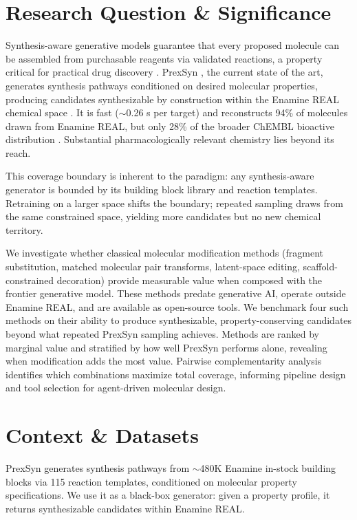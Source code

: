\section*{Research Question \& Significance}

Synthesis-aware generative models guarantee that every proposed molecule can be assembled from purchasable reagents via validated reactions, a property critical for practical drug discovery \cite{bib1}. PrexSyn \cite{bib2}, the current state of the art, generates synthesis pathways conditioned on desired molecular properties, producing candidates synthesizable by construction within the Enamine REAL chemical space \cite{bib3}. It is fast ($\sim$0.26 s per target) and reconstructs 94\% of molecules drawn from Enamine REAL, but only 28\% of the broader ChEMBL bioactive distribution \cite{bib2}. Substantial pharmacologically relevant chemistry lies beyond its reach.

This coverage boundary is inherent to the paradigm: any synthesis-aware generator is bounded by its building block library and reaction templates. Retraining on a larger space shifts the boundary; repeated sampling draws from the same constrained space, yielding more candidates but no new chemical territory.

We investigate whether classical molecular modification methods (fragment substitution, matched molecular pair transforms, latent-space editing, scaffold-constrained decoration) provide measurable value when composed with the frontier generative model. These methods predate generative AI, operate outside Enamine REAL, and are available as open-source tools. We benchmark four such methods on their ability to produce synthesizable, property-conserving candidates beyond what repeated PrexSyn sampling achieves. Methods are ranked by marginal value and stratified by how well PrexSyn performs alone, revealing when modification adds the most value. Pairwise complementarity analysis identifies which combinations maximize total coverage, informing pipeline design and tool selection for agent-driven molecular design.

\section*{Context \& Datasets}

PrexSyn \cite{bib2} generates synthesis pathways from $\sim$480K Enamine in-stock building blocks via 115 reaction templates, conditioned on molecular property specifications. We use it as a black-box generator: given a property profile, it returns synthesizable candidates within Enamine REAL.

